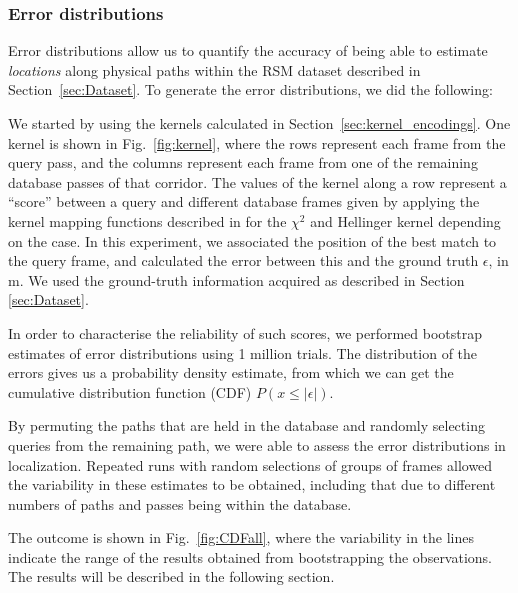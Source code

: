 \subsubsection{Error distributions}

Error distributions allow us to quantify the accuracy of being able to estimate {\em locations} along physical paths within the RSM dataset described in Section~\ref{sec:Dataset}. To generate the error distributions, we did the following: 

We started by using the kernels calculated in Section~\ref{sec:kernel_encodings}. One kernel is shown in Fig.~\ref{fig:kernel}, where the rows represent each frame from the query pass, and the columns represent each frame from one of the remaining database passes of that corridor. The values of the kernel along a row represent a ``score'' between a query and different database frames given by applying the kernel mapping functions described in \citep{Vedaldi2012} for the $\chi^2$ and Hellinger kernel depending on the case. In this experiment, we associated the position of the best match to the query frame, and calculated the error between this and the ground truth $\epsilon$, in m. We used the ground-truth information acquired as described in Section \ref{sec:Dataset}. 

In order to characterise the reliability of such scores, we performed bootstrap estimates of error distributions using 1 million trials. The distribution of the errors gives us a probability density estimate, from which we can get the cumulative distribution function (CDF) $P(x \leq |\epsilon|)$. 

By permuting the paths that are held in the database and randomly selecting queries from the remaining path, we were able to assess the error distributions in localization.  Repeated runs with random selections of groups of frames allowed the variability in these estimates to be obtained, including that due to different numbers of paths and passes being within the database. 

The outcome is shown in Fig.~\ref{fig:CDFall}, where the variability in the lines indicate the range of the results obtained from bootstrapping the observations. The results will be described in the following section.

